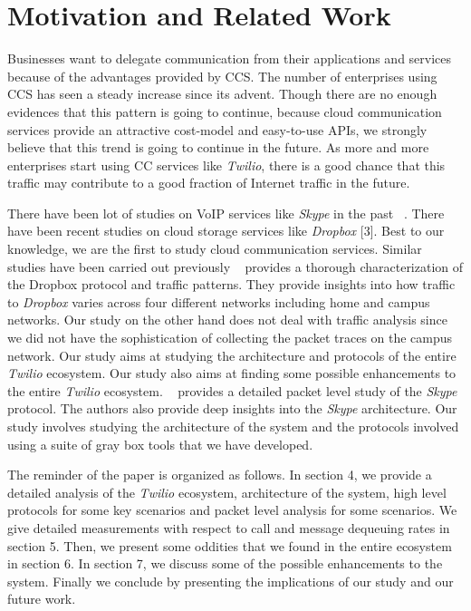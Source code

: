 \section{Motivation and Related Work}
\label{sec-motivationandrelated}
Businesses want to delegate communication from their applications and services because of the advantages provided by CCS. The number of enterprises using CCS has seen a steady increase since its advent. Though there are no enough evidences that this pattern is going to continue, because cloud communication services provide an attractive cost-model and easy-to-use APIs, we strongly believe that this trend is going to continue in the future. As more and more enterprises start using CC services like \textit{Twilio}, there is a good chance that this traffic may contribute to a good fraction of Internet traffic in the future. \par
There have been lot of studies on VoIP services like \textit{Skype} in the past ~\cite{Baset04ananalysis}. There have been recent studies on cloud storage services like \textit{Dropbox} [3]. Best to our knowledge, we are the first to study cloud communication services. Similar studies have been carried out previously ~\cite{Drago:2012:IDU:2398776.2398827} provides a thorough characterization of the Dropbox protocol and traffic patterns. They provide insights into how traffic to \textit{Dropbox} varies across four different networks including home and campus networks. Our study on the other hand does not deal with traffic analysis since we did not have the sophistication of collecting the packet traces on the campus network. Our study aims at studying the architecture and protocols of the entire \textit{Twilio} ecosystem. Our study also aims at finding some possible enhancements to the entire \textit{Twilio} ecosystem. ~\cite{Baset04ananalysis} provides a detailed packet level study of the \textit{Skype} protocol. The authors also provide deep insights into the \textit{Skype} architecture. Our study involves studying the architecture of the system and the protocols involved using a suite of gray box tools that we have developed. \par
The reminder of the paper is organized as follows. In section 4, we provide a detailed analysis of the \textit{Twilio} ecosystem, architecture of the system, high level protocols for some key scenarios and packet level analysis for some scenarios. We give detailed measurements with respect to call and message dequeuing rates in section 5. Then, we present some oddities that we found in the entire ecosystem in section 6. In section 7, we discuss some of the possible enhancements to the system. Finally we conclude by presenting the implications of our study and our future work.